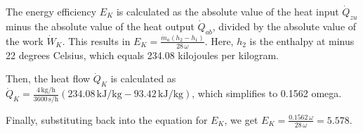 The energy efficiency \( E_K \) is calculated as the absolute value of the heat input \( \dot{Q}_{zu} \) minus the absolute value of the heat output \( \dot{Q}_{ab} \), divided by the absolute value of the work \( \dot{W}_{K} \). This results in \( E_K = \frac{\dot{m}_a (h_2 - h_1)}{28 \, \omega} \). Here, \( h_2 \) is the enthalpy at minus 22 degrees Celsius, which equals 234.08 kilojoules per kilogram.

Then, the heat flow \( \dot{Q}_{K} \) is calculated as \( \dot{Q}_{K} = \frac{4 \, \text{kg/h}}{3600 \, \text{s/h}} \left( 234.08 \, \text{kJ/kg} - 93.42 \, \text{kJ/kg} \right) \), which simplifies to 0.1562 omega.

Finally, substituting back into the equation for \( E_K \), we get \( E_K = \frac{0.1562 \, \omega}{28 \, \omega} = 5.578 \).